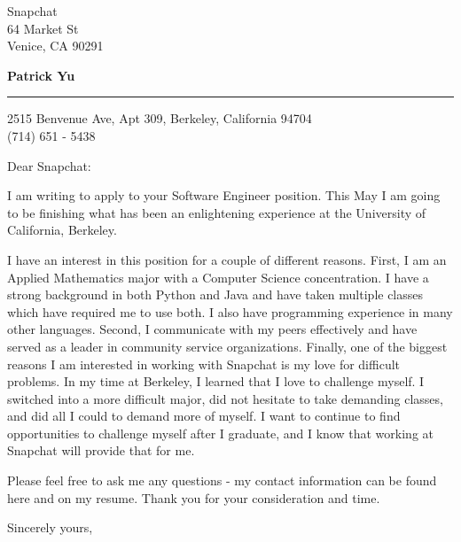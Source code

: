 \documentclass{letter} %
\begin{document}
\signature{Patrick Yu}           %
\longindentation=0pt                       %
\let\raggedleft\raggedright                %
 
 
\begin{letter}{
Snapchat\\
64 Market St\\
Venice, CA 90291}

\begin{flushleft}
{\large\bf Patrick Yu}
\end{flushleft}
\medskip\hrule height 1pt
\begin{flushright}
\hfill 2515 Benvenue Ave, Apt 309, Berkeley, California 94704 \\
\hfill (714) 651 - 5438
\end{flushright} 
\vfill %

 
\opening{Dear Snapchat:} 
 
\noindent I am writing to apply to your Software Engineer position. This May I am going to be finishing what has been an enlightening experience at the University of California, Berkeley.

\noindent I have an interest in this position for a couple of different reasons. First, I am an Applied Mathematics major with a Computer Science concentration. I have a strong background in both Python and Java and have taken multiple classes which have required me to use both.  I also have programming experience in many other languages.  Second, I communicate with my peers effectively and have served as a leader in community service organizations. Finally, one of the biggest reasons I am interested in working with Snapchat is my love for difficult problems. In my time at Berkeley, I learned that I love to challenge myself. I switched into a more difficult major, did not hesitate to take demanding classes, and did all I could to demand more of myself. I want to continue to find opportunities to challenge myself after I graduate, and I know that working at Snapchat will provide that for me.

\noindent Please feel free to ask me any questions - my contact information can be found here and on my resume. Thank you for your consideration and time.
 
\closing{Sincerely yours,} 
 

 

\end{letter}
 
\end{document}
